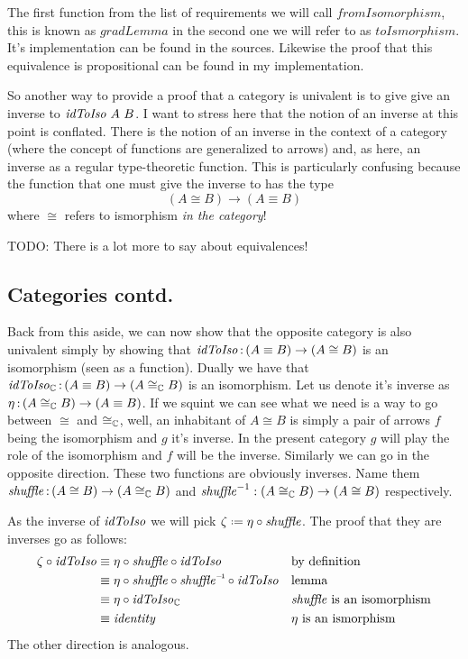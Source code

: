The first function from the list of requirements we will call
$\mathit{fromIsomorphism}$, this is known as $\mathit{gradLemma}$ in
\cite{cubical} the second one we will refer to as $\mathit{toIsmorphism}$. It's
implementation can be found in the sources. Likewise the proof that this
equivalence is propositional can be found in my implementation.

So another way to provide a proof that a category is univalent is to give give
an inverse to $\mathit{idToIso}\ A\ B$. I want to stress here that the notion of an
inverse at this point is conflated. There is the notion of an inverse in the
context of a category (where the concept of functions are generalized to arrows)
and, as here, an inverse as a regular type-theoretic function. This is
particularly confusing because the function that one must give the inverse to
has the type
%
$$
(A \cong B) \to (A \equiv B)
$$
%
where $\cong$ refers to ismorphism \emph{in the category}!

TODO: There is a lot more to say about equivalences!

\subsection{Categories contd.}
Back from this aside, we can now show that the opposite category is also
univalent simply by showing that $\mathit{idToIso} \,\mathord{:}\, (A \equiv B) \to (A \cong B)$ is
an isomorphism (seen as a function). Dually we have that $\mathit{idToIso}_{\mathbb{C}} \,\mathord{:}\, (A
\equiv B) \to (A \cong_{\mathbb{C}} B)$ is an isomorphism. Let us denote it's inverse
as $\eta \,\mathord{:}\, (A \cong_{\mathbb{C}} B) \to (A \equiv B)$. If we squint we can see what
we need is a way to go between $\cong$ and $\cong_{\mathbb{C}}$, well, an inhabitant of
$A \cong B$ is simply a pair of arrows $f$ being the isomorphism and $g$ it's
inverse. In the present category $g$ will play the role of the isomorphism and
$f$ will be the inverse. Similarly we can go in the opposite direction. These
two functions are obviously inverses. Name them $\mathit{shuffle} \,\mathord{:}\, (A \cong
B) \to (A \cong_{\mathbb{C}} B)$ and $\mathit{shuffle}^{-1} : (A \cong_{\mathbb{C}} B) \to (A
\cong B)$ respectively.

As the inverse of $\mathit{idToIso}$ we will pick $\zeta \defeq \eta \comp
\mathit{shuffle}$. The proof that they are inverses go as follows:
%
\begin{align*}
\zeta \comp \idToIso & \equiv
\eta \comp \shuffle \comp \idToIso
&& \text{by definition} \\
%
& \equiv
\eta \comp \shuffle \comp \inv{\shuffle} \comp \idToIso
&& \text{lemma} \\
& \equiv
\eta \comp \idToIso_{\bC}
&& \text{$\shuffle$ is an isomorphism} \\
& \equiv
\identity
&& \text{$\eta$ is an ismorphism} \\
\end{align*}
%
The other direction is analogous.

